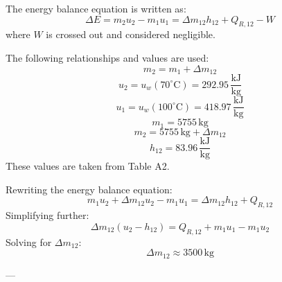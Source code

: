 The energy balance equation is written as:  
\[
\Delta E = m_2 u_2 - m_1 u_1 = \Delta m_{12} h_{12} + Q_{R,12} - W
\]  
where \( W \) is crossed out and considered negligible.  

The following relationships and values are used:  
\[
m_2 = m_1 + \Delta m_{12}
\]  
\[
u_2 = u_w(70^\circ\text{C}) = 292.95 \, \frac{\text{kJ}}{\text{kg}}
\]  
\[
u_1 = u_w(100^\circ\text{C}) = 418.97 \, \frac{\text{kJ}}{\text{kg}}
\]  
\[
m_1 = 5755 \, \text{kg}
\]  
\[
m_2 = 5755 \, \text{kg} + \Delta m_{12}
\]  
\[
h_{12} = 83.96 \, \frac{\text{kJ}}{\text{kg}}
\]  
These values are taken from Table A2.  

Rewriting the energy balance equation:  
\[
m_1 u_2 + \Delta m_{12} u_2 - m_1 u_1 = \Delta m_{12} h_{12} + Q_{R,12}
\]  
Simplifying further:  
\[
\Delta m_{12} (u_2 - h_{12}) = Q_{R,12} + m_1 u_1 - m_1 u_2
\]  
Solving for \( \Delta m_{12} \):  
\[
\Delta m_{12} \approx 3500 \, \text{kg}
\]  

---